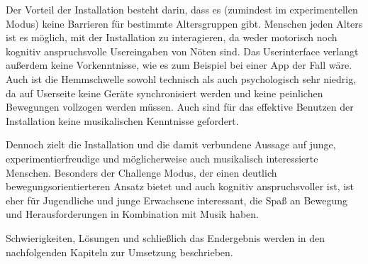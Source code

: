 
Der Vorteil der Installation besteht darin, dass es (zumindest im experimentellen Modus) keine Barrieren für bestimmte Altersgruppen gibt. Menschen jeden Alters ist es möglich, mit der Installation zu interagieren, da weder motorisch noch kognitiv anspruchsvolle Usereingaben von Nöten sind. Das Userinterface verlangt außerdem keine Vorkenntnisse, wie es zum Beispiel bei einer App der Fall wäre. Auch ist die Hemmschwelle sowohl technisch als auch psychologisch sehr niedrig, da auf Userseite keine Geräte synchronisiert werden und keine peinlichen Bewegungen vollzogen werden müssen. Auch sind für das effektive Benutzen der Installation keine musikalischen Kenntnisse gefordert.

Dennoch zielt die Installation und die damit verbundene Aussage auf junge, experimentierfreudige und möglicherweise auch musikalisch interessierte Menschen. Besonders der Challenge Modus, der einen deutlich bewegungsorientierteren Ansatz bietet und auch kognitiv anspruchsvoller ist, ist eher für Jugendliche und junge Erwachsene interessant, die Spaß an Bewegung und Herausforderungen in Kombination mit Musik haben.

Schwierigkeiten, Lösungen und schließlich das Endergebnis werden in den nachfolgenden Kapiteln zur Umsetzung beschrieben.